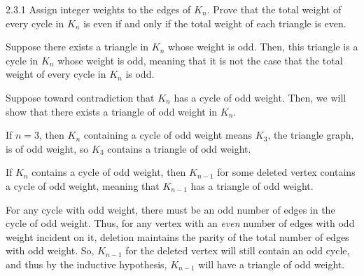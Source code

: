 \documentclass[10pt]{extarticle}
\begin{document}
  \begin{problem}{2.3.1}
    Assign integer weights to the edges of $K_n$. Prove that the total weight of every cycle in $K_n$ is even if and only if the total weight of each triangle is even.
    \tcblower
    \begin{description}[font=\normalfont\scshape]
      \item[$(\Rightarrow)$] Suppose there exists a triangle in $K_n$ whose weight is odd. Then, this triangle is a cycle in $K_n$ whose weight is odd, meaning that it is not the case that the total weight of every cycle in $K_n$ is odd.
      \item[$(\Leftarrow)$] Suppose toward contradiction that $K_n$ has a cycle of odd weight. Then, we will show that there exists a triangle of odd weight in $K_n$.
        \begin{description}[font = \normalfont\scshape]
          \item[Base Case:] If $n = 3$, then $K_n$ containing a cycle of odd weight means $K_3$, the triangle graph, is of odd weight, so $K_3$ contains a triangle of odd weight.
          \item[Inductive Hypothesis:] If $K_n$ contains a cycle of odd weight, then $K_{n-1}$ for some deleted vertex contains a cycle of odd weight, meaning that $K_{n-1}$ has a triangle of odd weight.
          \item[Proof:] For any cycle with odd weight, there must be an odd number of edges in the cycle of odd weight. Thus, for any vertex with an \textit{even} number of edges with odd weight incident on it, deletion maintains the parity of the total number of edges with odd weight. So, $K_{n-1}$ for the deleted vertex will still contain an odd cycle, and thus by the inductive hypothesis, $K_{n-1}$ will have a triangle of odd weight.
        \end{description}
    \end{description}
  \end{problem}
\end{document}
